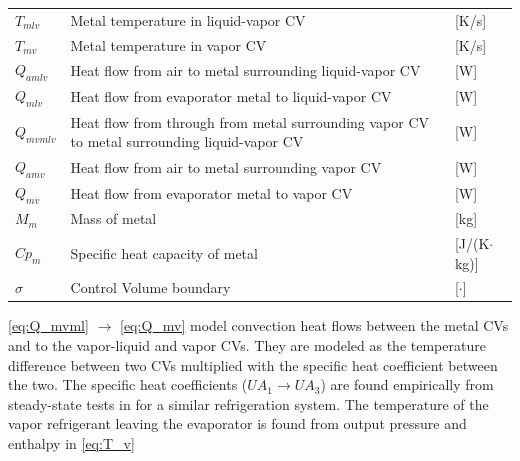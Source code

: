 \begin{center}
	\begin{tabular}{l p{10cm} l}
		$T_{mlv} $  & Metal temperature in liquid-vapor CV                                                        & [\si{K}/\si{s}]                   \\ %
		$T_{mv} $   & Metal temperature in vapor CV                                                               & [\si{K}/\si{s}]                   \\ %
		$Q_{amlv}$  & Heat flow from air to metal surrounding liquid-vapor CV                                     & [\si{W}]                          \\
		$Q_{mlv}$   & Heat flow from evaporator metal to liquid-vapor CV                                          & [\si{W}]                          \\
		$Q_{mvmlv}$ & Heat flow from through from metal surrounding vapor CV to metal surrounding liquid-vapor CV & [\si{W}]                          \\
		$Q_{amv}$   & Heat flow from air to metal surrounding vapor CV                                            & [\si{W}]                          \\
		$Q_{mv}$    & Heat flow from evaporator metal to vapor CV                                                 & [\si{W}]                          \\
		$M_{m} $    & Mass of metal                                                                               & [\si{kg}]                         \\
		$Cp_{m}$    & Specific heat capacity of metal                                                             & [\si{J}/(\si{K}$ \cdot $\si{kg})] \\
		$\sigma$    & Control Volume boundary                                                                     & [$\cdot$]
	\end{tabular}
\end{center}

\medskip
\cref{eq:Q_mvml} $\rightarrow$ \cref{eq:Q_mv} model convection heat flows between the metal CVs and to the vapor-liquid and vapor CVs. They are modeled as the temperature difference between two CVs multiplied with the specific heat coefficient between the two. The specific heat coefficients ($U A_1 \rightarrow U A_3$) are found empirically from steady-state tests in \cite{Sorensen2013} for a similar refrigeration system. The temperature of the vapor refrigerant leaving the evaporator is found from output pressure and enthalpy in \cref{eq:T_v}

